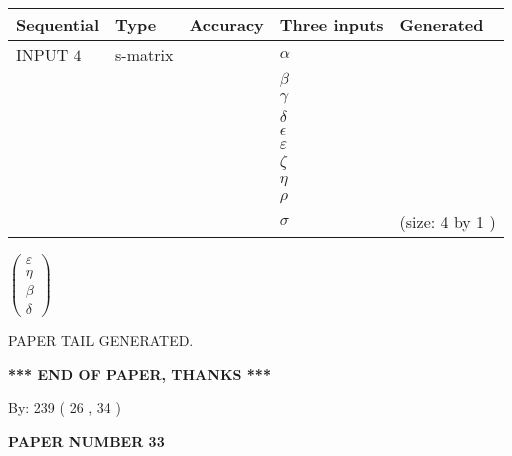 \documentclass[12pt]{article}
\begin{document}
  
\noindent\begin{tabular}{|l|l|l|l|l|}
\hline
 Sequential & Type & Accuracy & Three inputs & Generated \\ 
\hline
 
 
  INPUT $            4 $ & s-matrix & & 
 $  \alpha $ & 
  \\
  & & & 
 $  \beta $ & 
  \\
  & & & 
 $  \gamma $ & 
  \\
  & & & 
 $  \delta $ & 
  \\
  & & & 
 $  \epsilon $ & 
  \\
  & & & 
 $  \varepsilon $ & 
  \\
  & & & 
 $                     \zeta $ & 
  \\
  & & & 
 $  \eta $ & 
  \\
  & & & 
 $  \rho $ & 
  \\
  & & & 
 $  \sigma $ & 
  (size:            4  by            1 )
 \\  \hline  
 \end{tabular}
   
   
 $  \left( \begin{array}
 {
 c
 }
 \varepsilon \\ 
 \eta \\ 
 \beta \\ 
 \delta
 \end{array} \right) $ 
   
   
   
   
 \vspace{0.2in}
 
   
   
\vspace{2.0in} PAPER TAIL GENERATED.
   
   
   
   
\vspace{1.0in} 
{\textbf{\large{ *** END OF PAPER, THANKS *** }}} 
   
   
\hspace{1.0in} By: 
         239 (          26 ,           34 )
   
   
   
   
\newpage 
\setcounter{page}{ 
    33001 } 
   
   
   
   
 {\textbf{ \Large{ PAPER NUMBER           33  }}}
   
   
\vspace{0.2in}
   
\end{document}
